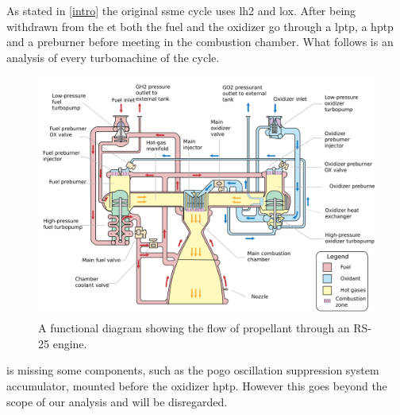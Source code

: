 As stated in \cref{intro} the original \acrshort{ssme} cycle uses \acrlong{lh2} and \acrlong{lox}. After being withdrawn from the \acrfull{et} both the fuel and the oxidizer go through a \acrfull{lptp}, a \acrfull{hptp} and a preburner before meeting in the combustion chamber. What follows is an analysis of every turbomachine of the cycle.
\begin{figure}
	\centering
 \includegraphics[width=.75\textwidth]{ssme_ciclo}
	\caption{A functional diagram showing the flow of propellant through an RS-25 engine.}
	\label{fig:ssme_cycle}
\end{figure}
 is missing some components, such as the pogo oscillation suppression system accumulator, mounted before the oxidizer \acrshort{hptp}. However this goes beyond the scope of our analysis and will be disregarded.
 
